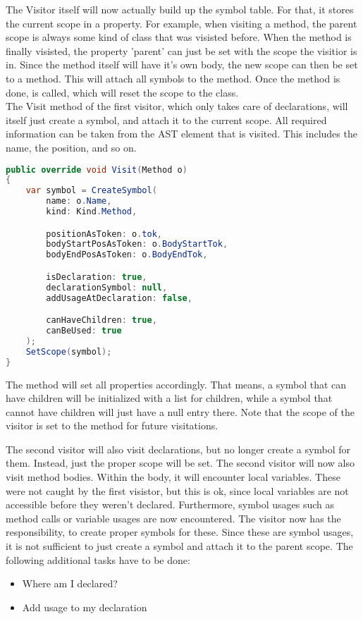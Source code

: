 The Visitor itself will now actually build up the symbol table. For that, it stores the current scope in a property. For example, when visiting a method, the parent scope is always some kind of class that was visisted before. When the method is finally visisted, the property 'parent' can just be set with the scope the visitior is in. Since the method itself will have it's own body, the new scope can then be set to a method. This will attach all symbols to the method. Once the method is done,  is called, which will reset the scope to the class.\\

The Visit method of the first visitor, which only takes care of declarations, will itself just create a symbol, and attach it to the current scope. All required information can be taken from the AST element that is visited. This includes the name, the position, and so on.\\

\begin{lstlisting}[language=csharp, caption={Visiting a Method}, captionpos=b, label={lst:visitorvisit1}]
public override void Visit(Method o)
{
    var symbol = CreateSymbol(
        name: o.Name,
        kind: Kind.Method,

        positionAsToken: o.tok,
        bodyStartPosAsToken: o.BodyStartTok,
        bodyEndPosAsToken: o.BodyEndTok,

        isDeclaration: true,
        declarationSymbol: null,
        addUsageAtDeclaration: false,

        canHaveChildren: true,
        canBeUsed: true
    );
    SetScope(symbol);
}
\end{lstlisting}

The  method will set all properties accordingly. That means, a symbol that can have children will be initialized with a list for children, while a symbol that cannot have children will just have a null entry there. Note that the scope of the visitor is set to the method for future visitations.

The second visitor will also visit declarations, but no longer create a symbol for them. Instead, just the proper scope will be set. The second visitor will now also visit method bodies. Within the body, it will encounter local variables. These were not caught by the first visistor, but this is ok, since local variables are not accessible before they weren't declared.  Furthermore, symbol usages such as method calls or variable usages are now encountered. The visitor now has the responsibility, to create proper symbols for these. Since these are symbol usages, it is not sufficient to just create a symbol and attach it to the parent scope. The following additional tasks have to be done:
\begin{itemize}
    \item Where am I declared?
    \item Add usage to my declaration
\end{itemize}

